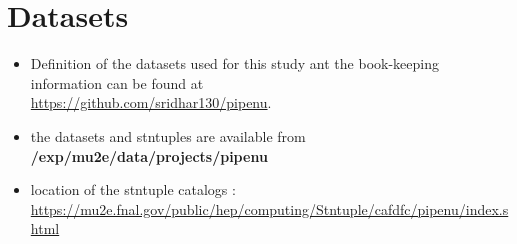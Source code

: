 \appendix

\section {Datasets}
\label{appendix_b}
\begin{itemize}
\item 
  Definition of the datasets used for this study ant the book-keeping information
  can be found at \\
  \href{https://github.com/sridhar130/pipenu}{https://github.com/sridhar130/pipenu}.
\item
  the datasets and stntuples are available from {\bf /exp/mu2e/data/projects/pipenu}
\item
  location of the stntuple catalogs : \\
  \href{https://mu2e.fnal.gov/public/hep/computing/Stntuple/cafdfc/pipenu/index.shtml}
  {https://mu2e.fnal.gov/public/hep/computing/Stntuple/cafdfc/pipenu/index.shtml}
\end{itemize}

